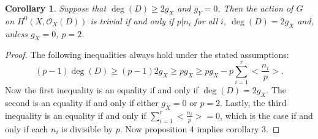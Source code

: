 \documentclass[11pt]{article} %
\newtheorem{cor}{Corollary}
\begin{document}
\begin{cor}
      Suppose that $\deg(D)\geq 2g_X$ and $g_Y=0$. Then the action of $G$ on $H^0(X,\mathscr{O}_X(D))$ is trivial if and 
      only if $p | n_i$ for all $i$, $\deg(D)=2g_X$ and, unless $g_X=0$, $p=2$.
\end{cor}
\begin{proof}
The following inequalities always hold under the stated assumptions:
	\[
		(p-1)\deg(D)\geq (p-1)2g_X \geq pg_X \geq pg_X-p\sum_{i=1}^r\Big<\frac{n_i}{p}\Big>.
	\]
Now the first inequality is an equality if and only if $\deg(D)=2g_X$. The second is an equality if and 
only if either $g_X=0$ or $p=2$. Lastly, the third inequality is an equality if and only if 
$\sum_{i=1}^r\Big<\frac{n_i}{p}\Big>=0$, which is the case if and only if each $n_i$ is divisible by $p$. 
Now proposition 4 implies corollary 3.
\end{proof}
\end{document}
